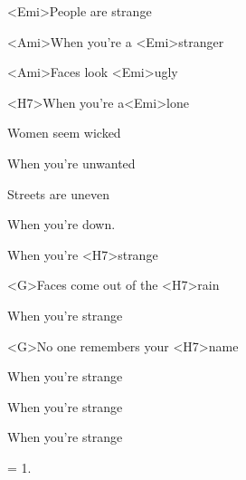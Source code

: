 

\zs
<Emi>People are strange

<Ami>When you're a <Emi>stranger

<Ami>Faces look <Emi>ugly

<H7>When you're a<Emi>lone

\bigskip

Women seem wicked

When you're unwanted

Streets are uneven

When you're down.
\ks

\zr
When you're <H7>strange

<G>Faces come out of the <H7>rain

When you're strange

<G>No one remembers your <H7>name

When you're strange

When you're strange

When you're strange
\kr

\zs
= 1.
\ks

\zr\kr

\kp
